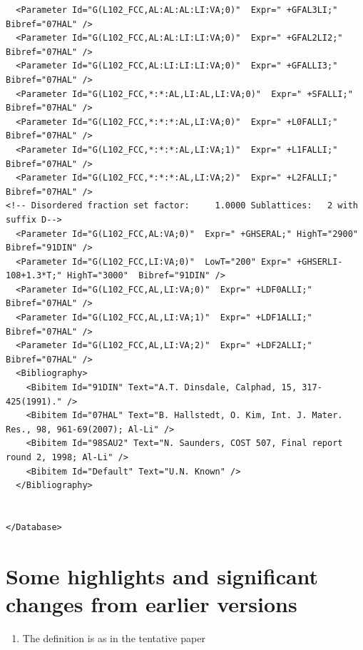 \documentclass{article}
\begin{document}
\begin{appendices}
\begin{verbatim}
  <Parameter Id="G(L102_FCC,AL:AL:AL:LI:VA;0)"  Expr=" +GFAL3LI;"  Bibref="07HAL" />
  <Parameter Id="G(L102_FCC,AL:AL:LI:LI:VA;0)"  Expr=" +GFAL2LI2;"  Bibref="07HAL" />
  <Parameter Id="G(L102_FCC,AL:LI:LI:LI:VA;0)"  Expr=" +GFALLI3;"  Bibref="07HAL" />
  <Parameter Id="G(L102_FCC,*:*:AL,LI:AL,LI:VA;0)"  Expr=" +SFALLI;"  Bibref="07HAL" />
  <Parameter Id="G(L102_FCC,*:*:*:AL,LI:VA;0)"  Expr=" +L0FALLI;"  Bibref="07HAL" />
  <Parameter Id="G(L102_FCC,*:*:*:AL,LI:VA;1)"  Expr=" +L1FALLI;"  Bibref="07HAL" />
  <Parameter Id="G(L102_FCC,*:*:*:AL,LI:VA;2)"  Expr=" +L2FALLI;"  Bibref="07HAL" />
<!-- Disordered fraction set factor:     1.0000 Sublattices:   2 with suffix D-->
  <Parameter Id="G(L102_FCC,AL:VA;0)"  Expr=" +GHSERAL;" HighT="2900"  Bibref="91DIN" />
  <Parameter Id="G(L102_FCC,LI:VA;0)"  LowT="200" Expr=" +GHSERLI-108+1.3*T;" HighT="3000"  Bibref="91DIN" />
  <Parameter Id="G(L102_FCC,AL,LI:VA;0)"  Expr=" +LDF0ALLI;"  Bibref="07HAL" />
  <Parameter Id="G(L102_FCC,AL,LI:VA;1)"  Expr=" +LDF1ALLI;"  Bibref="07HAL" />
  <Parameter Id="G(L102_FCC,AL,LI:VA;2)"  Expr=" +LDF2ALLI;"  Bibref="07HAL" />
  <Bibliography>
    <Bibitem Id="91DIN" Text="A.T. Dinsdale, Calphad, 15, 317-425(1991)." /> 
    <Bibitem Id="07HAL" Text="B. Hallstedt, O. Kim, Int. J. Mater. Res., 98, 961-69(2007); Al-Li" /> 
    <Bibitem Id="98SAU2" Text="N. Saunders, COST 507, Final report round 2, 1998; Al-Li" /> 
    <Bibitem Id="Default" Text="U.N. Known" /> 
  </Bibliography>


</Database>
\end{verbatim}

\newpage

\setcounter{equation}{0}
\renewcommand{\theequation}{E\arabic{equation}}
\setcounter{figure}{0}
\renewcommand{\thefigure}{E\arabic{figure}}


\section{Some highlights and significant changes from earlier versions}\label{sec:changes}

\begin{enumerate}
\item The definition is as in the tentative paper
  
\end{enumerate}

\end{appendices}
\end{document}
